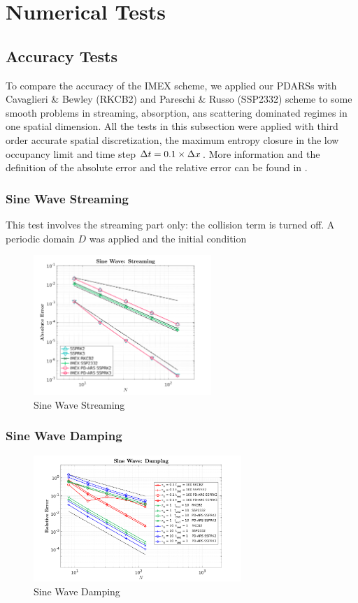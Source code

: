 \section{Numerical Tests}

\subsection{Accuracy Tests}
To compare the accuracy of the IMEX scheme, we applied our PDARSs with Cavaglieri \& Bewley \cite{cavaglieriBewley2015} (RKCB2) and Pareschi \& Russo \cite{pareschiRusso_2005} (SSP2332) scheme to some smooth problems in streaming, absorption, ans scattering dominated regimes in one spatial dimension.
All the tests in this subsection were applied with third order accurate spatial discretization, the maximum entropy closure in the low occupancy limit and time step $\Delta t = 0.1 \times \Delta x $.
More information and the definition of the absolute error and the relative error can be found in \cite{Chu_2018}.

\subsubsection{Sine Wave Streaming}
This test involves the streaming part only: the collision term is turned off. 
A periodic domain $D$ was applied and the initial condition 
\begin{figure}[h]
  \centering
    \includegraphics[width=0.6\textwidth]{figures/SineWaveStreaming}
   \caption{Sine Wave Streaming}
\end{figure}

\subsubsection{Sine Wave Damping}
\begin{figure}[h]
  \centering
    \includegraphics[width=0.7\textwidth]{figures/SineWaveDamping}
   \caption{Sine Wave Damping}
\end{figure}
